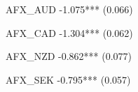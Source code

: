 AFX_AUD                                                                                                                    -1.075***                                                                                                         
                                                                                                                            (0.066)                                                                                                          
                                                                                                                                                                                                                                             
AFX_CAD                                                                                                                                             -1.304***                                                                                
                                                                                                                                                     (0.062)                                                                                 
                                                                                                                                                                                                                                             
AFX_NZD                                                                                                                                                                      -0.862***                                                       
                                                                                                                                                                              (0.077)                                                        
                                                                                                                                                                                                                                             
AFX_SEK                                                                                                                                                                                              -0.795***                               
                                                                                                                                                                                                      (0.057)                                
                                                                                                                                                                                                                                             
